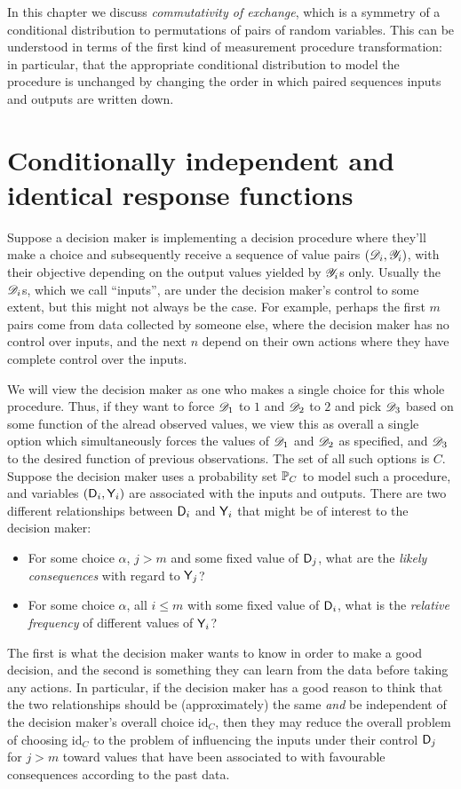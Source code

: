 In this chapter we discuss \emph{commutativity of exchange}, which is a symmetry of a conditional distribution to permutations of pairs of random variables. This can be understood in terms of the first kind of measurement procedure transformation: in particular, that the appropriate conditional distribution to model the procedure is unchanged by changing the order in which paired sequences inputs and outputs are written down.

\section[Response functions]{Conditionally independent and identical response functions}\label{sec:response_functions}

Suppose a decision maker is implementing a decision procedure where they'll make a choice and subsequently receive a sequence of value pairs $(\mathscr{D}_i,\mathscr{Y}_i)$, with their objective depending on the output values yielded by $\mathscr{Y}_i$s only. Usually the $\mathscr{D}_i$s, which we call ``inputs'', are under the decision maker's control to some extent, but this might not always be the case. For example, perhaps the first $m$ pairs come from data collected by someone else, where the decision maker has no control over inputs, and the next $n$ depend on their own actions where they have complete control over the inputs.

We will view the decision maker as one who makes a single choice for this whole procedure. Thus, if they want to force $\mathscr{D}_1$ to $1$ and $\mathscr{D}_2$ to $2$ and pick $\mathscr{D}_3$ based on some function of the alread observed values, we view this as overall a single option which simultaneously forces the values of $\mathscr{D}_1$ and $\mathscr{D}_2$ as specified, and $\mathscr{D}_3$ to the desired function of previous observations. The set of all such options is $C$. Suppose the decision maker uses a probability set $\mathbb{P}_C$ to model such a procedure, and variables $(\mathsf{D}_i,\mathsf{Y}_i)$ are associated with the inputs and outputs. There are two different relationships between $\mathsf{D}_i$ and $\mathsf{Y}_i$ that might be of interest to the decision maker:
\begin{itemize}
    \item For some choice $\alpha$, $j>m$ and some fixed value of $\mathsf{D}_j$, what are the \emph{likely consequences} with regard to $\mathsf{Y}_j$?
    \item For some choice $\alpha$, all $i\leq m$ with some fixed value of $\mathsf{D}_i$, what is the \emph{relative frequency} of different values of $\mathsf{Y}_i$?
\end{itemize}
The first is what the decision maker wants to know in order to make a good decision, and the second is something they can learn from the data before taking any actions. In particular, if the decision maker has a good reason to think that the two relationships should be (approximately) the same \emph{and} be independent of the decision maker's overall choice $\text{id}_C$, then they may reduce the overall problem of choosing $\text{id}_C$ to the problem of influencing the inputs under their control $\mathsf{D}_j$ for $j>m$ toward values that have been associated to with favourable consequences according to the past data.

